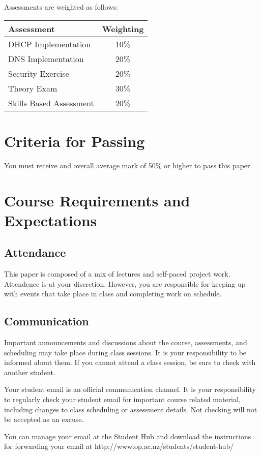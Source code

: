 \documentclass{article}
\begin{document}
Assessments are weighted as follows: \\
\begin{tabular}{|l|c|}
\hline
Assessment                  &  Weighting \\ \hline
DHCP Implementation         &  10\% \\ \hline
DNS Implementation          &  20\% \\ \hline
Security Exercise           &  20\% \\ \hline
Theory Exam                 &  30\% \\ \hline
Skills Based Assessment     &  20\% \\ \hline
\end{tabular}

\section*{Criteria for Passing}
You must receive and overall average mark of 50\% or higher to pass this paper.

\section*{Course Requirements and Expectations}
\subsection*{Attendance}
This paper is composed of a mix of lectures and self-paced project work.  Attendence is at your discretion. 
However, you are responsible for keeping up with events that take place in class and completing work on schedule. 

\subsection*{Communication}
Important announcements and discussions about the course, assessments, and scheduling may take place during class sessions.  It is your responsibility to be informed about them.  If you cannot attend a class session, be sure to check with another student.

Your student email is an official communication channel. It is your responsibility to regularly check your student email for important course related material, including changes to class scheduling or assessment details. Not checking will not be accepted as an excuse.

You can manage your email at the Student Hub and download the instructions for forwarding your email at http://www.op.ac.nz/students/student-hub/
\end{document}
